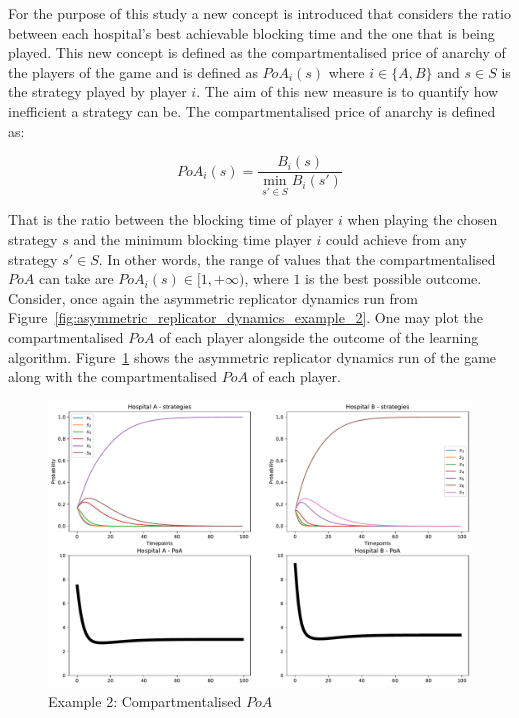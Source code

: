 For the purpose of this study a new concept is introduced that considers the
ratio between each hospital's best achievable blocking time and the one that is
being played.
This new concept is defined as the compartmentalised price of anarchy of the
players of the game and is defined as \(PoA_i(s)\) where \(i \in \{A, B\}\) and
\(s \in S\) is the strategy played by player \(i\).
The aim of this new measure is to quantify how inefficient a strategy can be.
The compartmentalised price of anarchy is defined as:

\begin{equation}\label{eq:compartmentalised_poa_definition}
    PoA_i(s) = \frac{B_i(s)}{\min_{s' \in S}{B_i(s')}}
\end{equation}

That is the ratio between the blocking time of player \(i\) when playing the
chosen strategy \(s\) and the minimum blocking time player \(i\) could achieve
from any strategy \(s' \in S\).
In other words, the range of values that the compartmentalised \(PoA\) can take
are \(PoA_i(s) \in [1, +\infty)\), where \(1\) is the best possible outcome.
Consider, once again the asymmetric replicator dynamics run from
Figure~\ref{fig:asymmetric_replicator_dynamics_example_2}.
One may plot the compartmentalised \(PoA\) of each player alongside the outcome
of the learning algorithm.
Figure~\ref{fig:compartmentalised_poa_example_2} shows the asymmetric replicator
dynamics run of the game along with the compartmentalised \(PoA\) of each player.

\begin{figure}[H]
    \centering
    \includegraphics[width=\linewidth]{chapters/05_numerical_results/Bin/example_2/poa_ard_example_2.pdf}
    \caption{Example 2: Compartmentalised \(PoA\)}
    \label{fig:compartmentalised_poa_example_2}
\end{figure}

